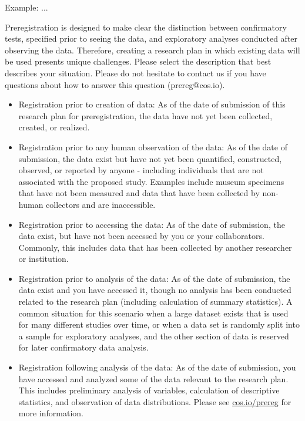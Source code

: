 \documentclass[highlight, explanations]{prereg}
\begin{document}
{Example: ...}
{Preregistration is designed to make clear the distinction between confirmatory tests, specified prior to seeing the data, and exploratory analyses conducted after observing the data. Therefore, creating a research plan in which existing data will be used presents unique challenges. Please select the description that best describes your situation. Please do not hesitate to contact us if you have questions about how to answer this question (prereg@cos.io).
\begin{itemize}
    \item Registration prior to creation of data: As of the date of submission of this research plan for preregistration, the data have not yet been collected, created, or realized. 
    \item Registration prior to any human observation of the data: As of the date of submission, the data exist but have not yet been quantified, constructed, observed, or reported by anyone - including individuals that are not associated with the proposed study. Examples include museum specimens that have not been measured and data that have been collected by non-human collectors and are inaccessible.
    \item Registration prior to accessing the data: As of the date of submission, the data exist, but have not been accessed by you or your collaborators. Commonly, this includes data that has been collected by another researcher or institution.
    \item Registration prior to analysis of the data: As of the date of submission, the data exist and you have accessed it, though no analysis has been conducted related to the research plan (including calculation of summary statistics). A common situation for this scenario when a large dataset exists that is used for many different studies over time, or when a data set is randomly split into a sample for exploratory analyses, and the other section of data is reserved for later confirmatory data analysis.
    \item Registration following analysis of the data: As of the date of submission, you have accessed and analyzed some of the data relevant to the research plan. This includes preliminary analysis of variables, calculation of descriptive statistics, and observation of data distributions. Please see \url{cos.io/prereg} for more information. 
\end{itemize}
}
\end{document}
